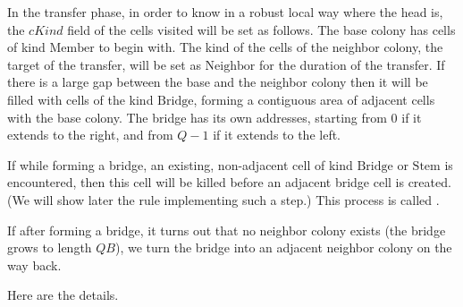 \documentclass[12pt]{memoir}
\newcommand{\fld}[1]{\ensuremath{\textit{#1}}}
\def\B{B}
\newcommand{\cKind}{\fld{cKind}}
\newcommand{\Bridge}{\mathrm{Bridge}}
\newcommand{\Member}{\mathrm{Member}}
\newcommand{\Neighbor}{\mathrm{Neighbor}}
\newcommand{\Stem}{\mathrm{Stem}}
\begin{document}
In the transfer phase, in order to know in a robust local way where the head is,
the \( \cKind \) field of the cells visited will be set as follows.
The base colony has cells of kind \( \Member \) to begin with.
The kind of the cells of the neighbor colony, the target of the transfer, will be set
as \( \Neighbor \) for the duration of the transfer.
If there is a large gap between the base and the neighbor colony then it will be
filled with cells of the kind \( \Bridge \), forming a contiguous area of adjacent cells
with the base colony.
The bridge has its own addresses, starting from 0 if it extends to the right,
and from \( Q-1 \) if it extends to the left.

If while forming a bridge, an existing, non-adjacent 
cell of kind \( \Bridge \) or \( \Stem \)
is encountered, then this cell will be killed before an adjacent bridge cell is created.
(We will show later the rule implementing such a step.) %
This process is called .

If after forming a bridge,
it turns out that no neighbor colony exists (the bridge grows to length \( Q\B \)), 
we turn the bridge into an adjacent neighbor colony on the way back.

    Here are the details.
\end{document}
